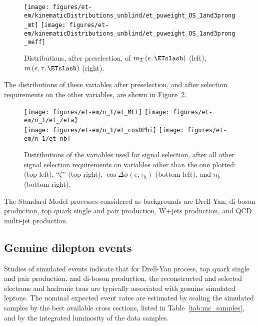 \begin{figure}\centering
  \texttt{[image: figures/et-em/kinematicDistributions\_unblind/et\_puweight\_OS\_1and3prong\_mt]}
  \texttt{[image: figures/et-em/kinematicDistributions\_unblind/et\_puweight\_OS\_1and3prong\_meff]} \\
  \caption{\label{fig:et_preselection_distributions3} Distributions,
    after \teth preselection, of $m_{T}\left(e, \ETslash\right)$
    (left), $m\left(e, \tau, \ETslash\right)$ (right).}
\end{figure}

The distributions of these variables after preselection, and after
selection requirements on the other variables, are shown in
Figure~\ref{fig:et_nm1_distributions}.

\begin{figure}\centering
  \texttt{[image: figures/et-em/n\_1/et\_MET]}
  \texttt{[image: figures/et-em/n\_1/et\_Zeta]} \\
  \texttt{[image: figures/et-em/n\_1/et\_cosDPhi]}
  \texttt{[image: figures/et-em/n\_1/et\_nb]}
  \caption{\label{fig:et_nm1_distributions} Distributions of the
    variables used for \teth signal selection, after all other signal
    selection requirements on variables other than the one plotted:
    \ETslash (top left), ``$\zeta$'' (top right), $\cos{\Delta \phi
      (e,\tau_{h})}$ (bottom left), and $n_b$ (bottom right).}
\end{figure}

The Standard Model processes considered as backgrounds are Drell-Yan,
di-boson production, top quark single and pair production, W+jets
production, and QCD multi-jet production.

\subsection{Genuine dilepton events}

Studies of simulated events indicate that for Drell-Yan process, top
quark single and pair production, and di-boson production, the
reconstructed and selected electrons and hadronic taus are typically
associated with genuine simulated leptons.  The nominal expected event
rates are estimated by scaling the simulated samples by the best
available cross sections, listed in Table~\ref{tab:mc_samples}, and by
the integrated luminosity of the data samples.

